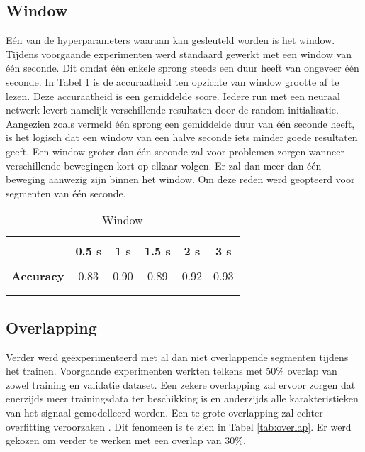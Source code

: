 \subsection{Window}
Eén van de hyperparameters waaraan kan gesleuteld worden is het window. Tijdens voorgaande experimenten werd standaard gewerkt met een window van één seconde. Dit omdat één enkele sprong steeds een duur heeft van ongeveer één seconde. In Tabel \ref{tab:window} is de accuraatheid ten opzichte van window grootte af te lezen. Deze accuraatheid is een gemiddelde score. Iedere run met een neuraal netwerk levert namelijk verschillende resultaten door de random initialisatie. Aangezien zoals vermeld één sprong een gemiddelde duur van één seconde heeft, is het logisch dat een window van een halve seconde iets minder goede resultaten geeft. Een window groter dan één seconde zal voor problemen zorgen wanneer verschillende bewegingen kort op elkaar volgen. Er zal dan meer dan één beweging aanwezig zijn binnen het window. Om deze reden werd geopteerd voor segmenten van één seconde.

\begin{table}[!htpd]
  \centering
  \caption{Window}
  \label{tab:window}
\begin{tabular}{lccccc}
 \hline \\
\textbf{}         & \textbf{0.5 s} & \textbf{1 s} & \textbf{1.5 s} & \textbf{2 s} & \textbf{3 s} \\
 \hline \\
\textbf{Accuracy} & 0.83           & 0.90         & 0.89           & 0.92         & 0.93  \\\\
 \hline \\
\end{tabular}
\end{table}

\subsection{Overlapping}
Verder werd geëxperimenteerd met al dan niet overlappende segmenten tijdens het trainen. Voorgaande experimenten werkten telkens met 50\% overlap van zowel training en validatie dataset. Een zekere overlapping zal ervoor zorgen dat enerzijds meer trainingsdata ter beschikking is en anderzijds alle karakteristieken van het signaal gemodelleerd worden. Een te grote overlapping zal echter overfitting veroorzaken \cite{ref81}. Dit fenomeen is te zien in Tabel \ref{tab:overlap}. Er werd gekozen om verder te werken met een overlap van 30\%.


